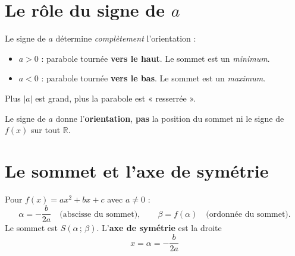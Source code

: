 \documentclass[11pt,a4paper]{article}
\begin{document}
\begin{center}
\end{center}

\section{Le rôle du signe de \texorpdfstring{$a$}{a}}

\begin{indice}
Le signe de $a$ détermine \emph{complètement} l'orientation :
\begin{itemize}[leftmargin=*]
  \item $a > 0$ : parabole tournée \textbf{vers le haut}. Le sommet est un \emph{minimum}.
  \item $a < 0$ : parabole tournée \textbf{vers le bas}. Le sommet est un \emph{maximum}.
\end{itemize}
Plus $|a|$ est grand, plus la parabole est « resserrée ».
\end{indice}

\begin{alerte}
Le signe de $a$ donne l'\textbf{orientation}, \textbf{pas} la position du sommet ni le signe de $f(x)$ sur tout $\mathbb{R}$.
\end{alerte}

\section{Le sommet et l'axe de symétrie}

\begin{indice}
Pour $f(x) = ax^2+bx+c$ avec $a \neq 0$ :
\[
  \alpha = -\frac{b}{2a} \quad \text{(abscisse du sommet)},
  \qquad
  \beta = f(\alpha) \quad \text{(ordonnée du sommet)}.
\]
Le sommet est $S(\alpha\,;\,\beta)$. L'\textbf{axe de symétrie} est la droite
\[
  \boxed{\;x = \alpha = -\frac{b}{2a}\;}
\]
\end{indice}
\end{document}
